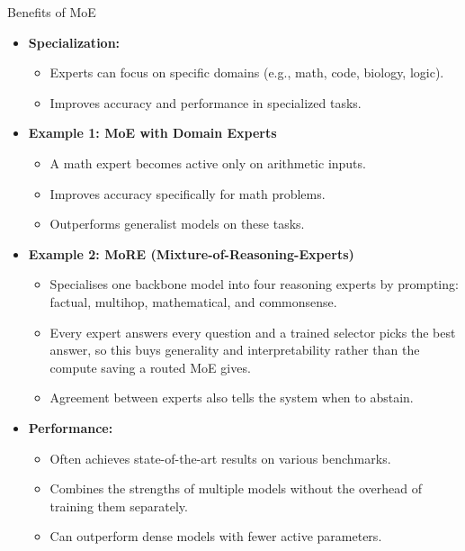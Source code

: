 \begin{frame}[allowframebreaks]{Benefits of MoE}
\begin{itemize}
\begin{itemize}
            \item Can be tailored to specific applications or domains.
        \end{itemize}
    \framebreak
        \item \textbf{Specialization:}
        \begin{itemize}
            \item Experts can focus on specific domains (e.g., math, code, biology, logic).
            \item Improves accuracy and performance in specialized tasks.
        \end{itemize}
        \item \textbf{Example 1: MoE with Domain Experts}
        \begin{itemize}
            \item A math expert becomes active only on arithmetic inputs.
            \item Improves accuracy specifically for math problems.
            \item Outperforms generalist models on these tasks.
        \end{itemize}
        \item \textbf{Example 2: MoRE (Mixture-of-Reasoning-Experts)}
        \begin{itemize}
            \item Specialises one backbone model into four reasoning experts by prompting: factual, multihop, mathematical, and commonsense.
            \item Every expert answers every question and a trained selector picks the best answer, so this buys generality and interpretability rather than the compute saving a routed MoE gives.
            \item Agreement between experts also tells the system when to abstain.
        \end{itemize}
    \framebreak
        \item \textbf{Performance:}
        \begin{itemize}
            \item Often achieves state-of-the-art results on various benchmarks.
            \item Combines the strengths of multiple models without the overhead of training them separately.
            \item Can outperform dense models with fewer active parameters.
        \end{itemize}
    \end{itemize}
\end{frame}